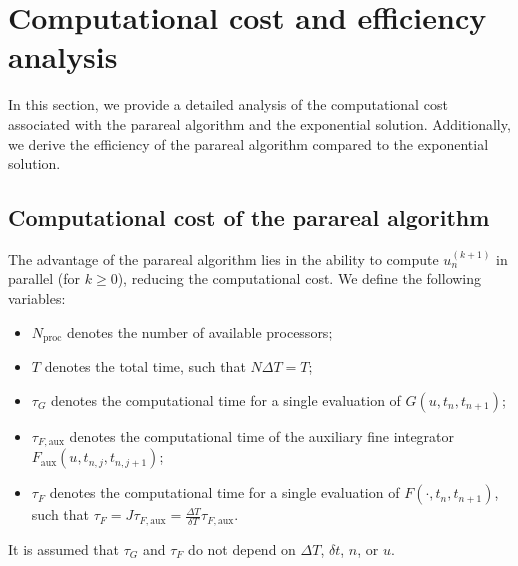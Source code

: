 \documentclass[preprint,12pt]{elsarticle}
\begin{document}
	\section{Computational cost and efficiency analysis}\label{sec4}
	In this section, we provide a detailed analysis of the computational cost associated with the parareal algorithm and the exponential solution. Additionally, we derive the efficiency of the parareal algorithm compared to the exponential solution.
	
	\subsection{Computational cost of the parareal algorithm}
	The advantage of the parareal algorithm lies in the ability to compute $u_n^{(k+1)}$ in parallel (for $k \geq 0$), reducing the computational cost. We define the following variables:
	\begin{itemize}
		\item  $N_{\text{proc}}$ denotes the number of available processors;
		\item $T$ denotes the total time, such that $N \Delta T = T$;
		\item $\tau_G$ denotes the computational time for a single evaluation of $G(u, t_n, t_{n+1})$;
		\item $\tau_{F,\text{aux}}$ denotes the computational time of the auxiliary fine integrator $F_{\text{aux}}(u, t_{n,j}, t_{n,j+1})$;
		\item $\tau_F$ denotes the computational time for a single evaluation of $F(\cdot, t_n, t_{n+1})$, such that $\tau_F = J \tau_{F,\text{aux}} = \frac{\Delta T}{\delta T} \tau_{F,\text{aux}}$.
	\end{itemize}
	
	It is assumed that $\tau_G$ and $\tau_F$ do not depend on $\Delta T$, $\delta t$, $n$, or $u$.
	
\end{document}
